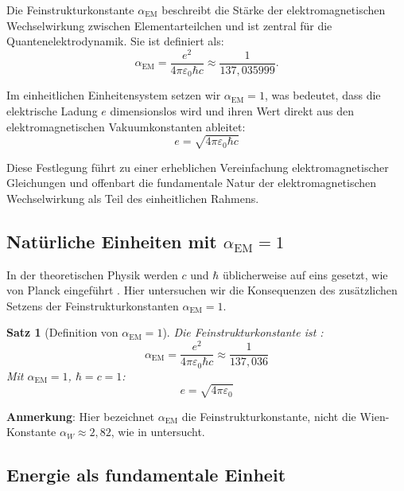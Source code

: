 \documentclass[12pt,a4paper]{article}
\newcommand{\alphaEM}{\alpha_{\text{EM}}}
\newtheorem{theorem}{Satz}[section]
\begin{document}
	Die Feinstrukturkonstante \(\alphaEM\) beschreibt die Stärke der elektromagnetischen Wechselwirkung zwischen Elementarteilchen und ist zentral für die Quantenelektrodynamik. Sie ist definiert als:
	\begin{equation}
		\label{eq:alpha_em_def}
		\alphaEM = \frac{e^2}{4\pi \varepsilon_0 \hbar c} \approx \frac{1}{137,035999}.
	\end{equation}
	
	Im einheitlichen Einheitensystem setzen wir \(\alphaEM = 1\), was bedeutet, dass die elektrische Ladung \(e\) dimensionslos wird und ihren Wert direkt aus den elektromagnetischen Vakuumkonstanten ableitet:
	\begin{equation}
		\label{eq:charge_relation}
		e = \sqrt{4\pi \varepsilon_0 \hbar c}
	\end{equation}
	
	Diese Festlegung führt zu einer erheblichen Vereinfachung elektromagnetischer Gleichungen und offenbart die fundamentale Natur der elektromagnetischen Wechselwirkung als Teil des einheitlichen Rahmens.
	
	\subsection{Natürliche Einheiten mit \(\alphaEM = 1\)}
	\label{subsec:alpha_one}
	
	In der theoretischen Physik werden \(c\) und \(\hbar\) üblicherweise auf eins gesetzt, wie von Planck eingeführt \cite{planck1899}. Hier untersuchen wir die Konsequenzen des zusätzlichen Setzens der Feinstrukturkonstanten \(\alphaEM = 1\).
	
	\begin{theorem}[Definition von \(\alphaEM = 1\)]
		Die Feinstrukturkonstante ist \cite{Feynman1985}:
		\begin{equation}
			\alphaEM = \frac{e^2}{4\pi\varepsilon_0 \hbar c} \approx \frac{1}{137,036}
		\end{equation}
		Mit \(\alphaEM = 1\), \(\hbar = c = 1\):
		\begin{equation}
			e = \sqrt{4\pi\varepsilon_0}
		\end{equation}
	\end{theorem}
	
	\textbf{Anmerkung}: Hier bezeichnet \(\alphaEM\) die Feinstrukturkonstante, nicht die Wien-Konstante \(\alpha_W \approx 2,82\), wie in \cite{pascher_temp_2025} untersucht.
	
	\subsection{Energie als fundamentale Einheit}
	\label{subsec:energy_fundamental}
	
\end{document}
